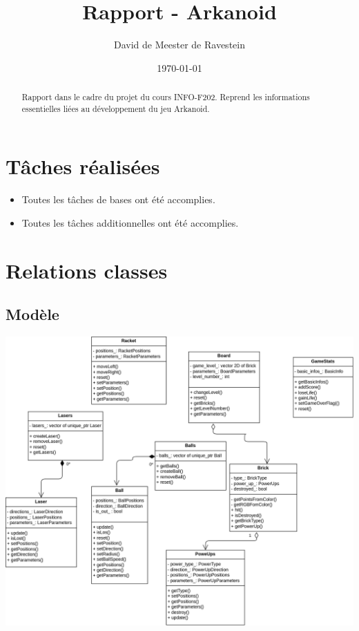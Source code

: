 \documentclass{article}
\title{Rapport - Arkanoid}
\author{David de Meester de Ravestein}
\date{\today}
\begin{document}
\maketitle

\begin{abstract}
Rapport dans le cadre du projet du cours INFO-F202. Reprend les informations essentielles liées au développement du jeu Arkanoid.
\end{abstract}

\tableofcontents
\newpage

\section{Tâches réalisées}

\begin{itemize}
	\item Toutes les tâches de bases ont été accomplies.
	\item Toutes les tâches additionnelles ont été accomplies.
\end{itemize}

\section{Relations classes}

\subsection{Modèle}


\includegraphics[width=\textwidth]{model.png}
\end{document}
